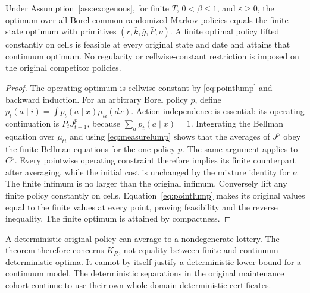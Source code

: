 \begin{theorem}\label{thm:atomic}
Under Assumption~\ref{ass:exogenous}, for finite $T$, $0<\beta\leq1$, and $\varepsilon\geq0$, the optimum over all Borel common randomized Markov policies equals the finite-state optimum with primitives $(\bar r,\bar k,\bar g,\bar P,\nu)$. A finite optimal policy lifted constantly on cells is feasible at every original state and date and attains that continuum optimum. No regularity or cellwise-constant restriction is imposed on the original competitor policies.
\end{theorem}
\begin{proof}
The operating optimum is cellwise constant by \eqref{eq:pointlump} and backward induction. For an arbitrary Borel policy $p$, define $\bar p_t(a\mid i)=\int p_t(a\mid x)\mu_{ti}(dx)$. Action independence is essential: its operating continuation is $P_tJ_{t+1}^p$, because $\sum_a p_t(a\mid x)=1$. Integrating the Bellman equation over $\mu_{ti}$ and using \eqref{eq:measurelump} shows that the averages of $J^p$ obey the finite Bellman equations for the one policy $\bar p$. The same argument applies to $C^p$. Every pointwise operating constraint therefore implies its finite counterpart after averaging, while the initial cost is unchanged by the mixture identity for $\nu$. The finite infimum is no larger than the original infimum. Conversely lift any finite policy constantly on cells. Equation~\eqref{eq:pointlump} makes its original values equal to the finite values at every point, proving feasibility and the reverse inequality. The finite optimum is attained by compactness.
\end{proof}
A deterministic original policy can average to a nondegenerate lottery. The theorem therefore concerns $K_R$, not equality between finite and continuum deterministic optima. It cannot by itself justify a deterministic lower bound for a continuum model. The deterministic separations in the original maintenance cohort continue to use their own whole-domain deterministic certificates.

